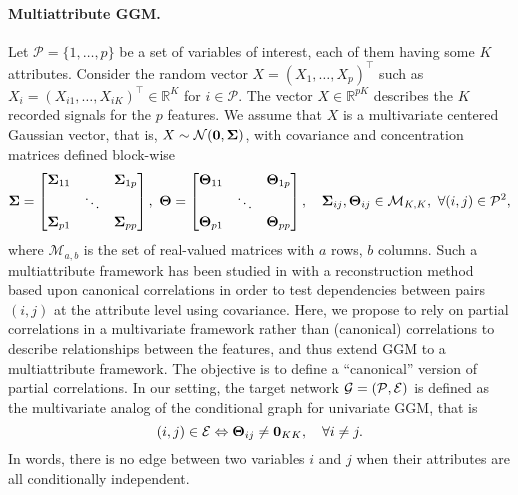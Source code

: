 \paragraph*{Multiattribute GGM.}   Let $\mathcal{P}=\{1,\dots,p\}$ be
a  set  of  variables  of  interest, each  of  them  having  some  $K$
attributes.    Consider  the   random   vector  $X   =  (X_1,   \dots,
X_p)^\intercal$  such  as  $X_i  =(X_{i1},\dots,X_{iK})^\intercal  \in
\mathbb{R}^K$ for $i\in\mathcal{P}$. The vector $X\in \mathbb{R}^{pK}$
describes the  $K$ recorded signals  for the $p$ features.   We assume
that $X$ is a multivariate centered  Gaussian vector, that is, $X \sim
\mathcal{N}(\mathbf{0}, {\boldsymbol\Sigma})$,  with covariance  and concentration
matrices defined block-wise
\[
{\boldsymbol\Sigma} = \begin{bmatrix}
  {\boldsymbol\Sigma}_{11} & & {\boldsymbol\Sigma}_{1p} \\
  & \ddots & \\
  {\boldsymbol\Sigma}_{p1} & & {\boldsymbol\Sigma}_{pp} \\
\end{bmatrix}, \ \boldsymbol\Theta = \begin{bmatrix}
  \boldsymbol\Theta_{11} & & \boldsymbol\Theta_{1p} \\
  & \ddots & \\
  \boldsymbol\Theta_{p1} & & \boldsymbol\Theta_{pp} \\
\end{bmatrix}, \quad {\boldsymbol\Sigma}_{ij}, \boldsymbol\Theta_{ij}\in \mathcal{M}_{K,K},
\ \forall (i,j)\in\mathcal{P}^2,
\]
where $\mathcal{M}_{a,b}$ is the set of real-valued matrices with $a$
rows, $b$ columns.  Such a multiattribute framework has been studied
in \citet{katenka2012inference} with a reconstruction method based
upon canonical correlations in order to test dependencies between
pairs $(i,j)$ at the attribute level using covariance.  Here, we
propose to rely on partial correlations in a multivariate framework
rather than (canonical) correlations to describe relationships between
the features, and thus extend GGM to a multiattribute framework.  The
objective is to define a ``canonical'' version of partial
correlations.  In our setting, the target network
$\mathcal{G}=(\mathcal{P},\mathcal{E})$ is defined as the multivariate
analog of the conditional graph for univariate GGM, that is
\begin{equation}
  \label{eq:multi_net}
  (i,j)  \in  \mathcal{E}  \Leftrightarrow \invcov_{ij}  \neq  \bzr_{KK},
  \quad \forall i\neq j.
\end{equation}
In words,  there is  no edge  between two variables  $i$ and  $j$ when
their attributes are all conditionally independent.

